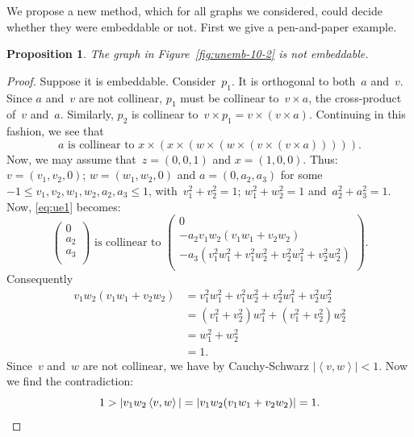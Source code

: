 \documentclass[adraft,copyright,creativecommons]{eptcs}
\newcounter{main}
\newtheorem{prop}[main]{Proposition}
\theoremstyle{definition}
\theoremstyle{remark}
\begin{document}
We propose a new method,
which for all graphs we considered,
could decide
whether they were embeddable or not.
First we give a pen-and-paper example.
\begin{prop}\label{prop:unemb-10-2}
The graph in Figure~\ref{fig:unemb-10-2}
is not embeddable.
\end{prop}
\begin{proof}
Suppose it is embeddable.
Consider~$p_1$.
It is orthogonal to both~$a$ and~$v$.
Since $a$ and~$v$ are not collinear,
$p_1$ must be collinear to~$v \times a$,
the cross-product of~$v$ and~$a$.
Similarly, $p_2$ is collinear to~$v \times p_1 = v \times (v \times a)$.
Continuing in this fashion,
we see that
\begin{equation}\label{eq:ue1}
    a \text{ is collinear to }
    x \times (x \times( w \times (w\times (v \times (v \times a))))).
\end{equation}
Now, we may assume that~$z=(0,0,1)$ and $x=(1,0,0)$.
Thus: $v=(v_1,v_2,0)$;
$w = (w_1,w_2,0)$
and $a = (0, a_2,a_3)$ for some~$-1 \leq v_1,v_2,w_1,w_2,a_2,a_3 \leq 1$,
with~$v_1^2+v_2^2 = 1$; $w_1^2+w_2^2=1$ and~$a_2^2 + a_3^2=1$.
Now, \eqref{eq:ue1} becomes:
\begin{equation*}
\begin{pmatrix}
0\\
a_2\\
a_3\\
\end{pmatrix}
\text{ is collinear to }
\begin{pmatrix}
0\\
-a_2 v_1w_2 (v_1w_1 + v_2w_2) \\
-a_3 (v_1^2 w_1^2 + v_1^2 w_2^2 + v_2^2w_1^2 + v_2^2w_2^2)\\
\end{pmatrix}.
\end{equation*}
Consequently
\begin{align*}
    v_1w_2 (v_1w_1 + v_2w_2)
& = v_1^2 w_1^2 + v_1^2 w_2^2 + v_2^2w_1^2 + v_2^2w_2^2 \\
& = (v_1^2 + v_2^2)w_1^2 + (v_1^2 + v_2^2)w_2^2 \\
& = w_1^2 + w_2^2 \\
&= 1.
\end{align*}
Since~$v$ and~$w$ are not collinear,
we have by Cauchy-Schwarz $|\left<v,w\right>| < 1$.
Now we find the contradiction:
\begin{equation*}
1 > |v_1w_2\left<v,w\right>| = |v_1w_2(v_1w_1+v_2w_2)| = 1. \qedhere
\end{equation*}
\end{proof}
\end{document}
